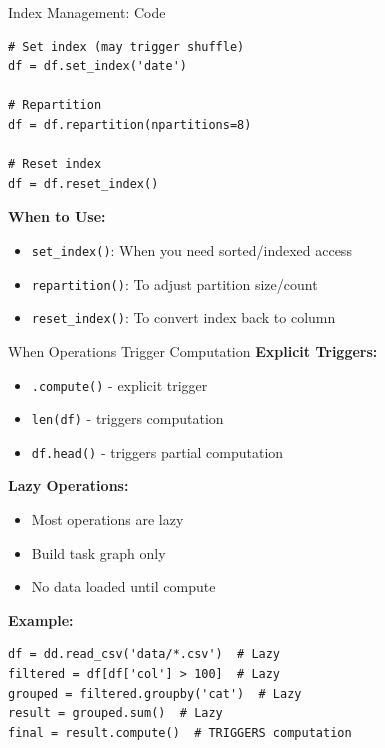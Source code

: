 \documentclass[aspectratio=169]{beamer}
\begin{document}
\begin{frame}[fragile]{Index Management: Code}
\small
\begin{lstlisting}[basicstyle=\ttfamily\tiny]
# Set index (may trigger shuffle)
df = df.set_index('date')

# Repartition
df = df.repartition(npartitions=8)

# Reset index
df = df.reset_index()
\end{lstlisting}

\vspace{0.2cm}
\textbf{When to Use:}
\begin{itemize}
    \item \texttt{set\_index()}: When you need sorted/indexed access
    \item \texttt{repartition()}: To adjust partition size/count
    \item \texttt{reset\_index()}: To convert index back to column
\end{itemize}
\end{frame}

\begin{frame}[fragile]{When Operations Trigger Computation}
\small
\textbf{Explicit Triggers:}
\begin{itemize}
    \item \texttt{.compute()} - explicit trigger
    \item \texttt{len(df)} - triggers computation
    \item \texttt{df.head()} - triggers partial computation
\end{itemize}

\textbf{Lazy Operations:}
\begin{itemize}
    \item Most operations are lazy
    \item Build task graph only
    \item No data loaded until compute
\end{itemize}

\vspace{0.15cm}
\textbf{Example:}
\begin{lstlisting}
df = dd.read_csv('data/*.csv')  # Lazy
filtered = df[df['col'] > 100]  # Lazy
grouped = filtered.groupby('cat')  # Lazy
result = grouped.sum()  # Lazy
final = result.compute()  # TRIGGERS computation
\end{lstlisting}
\end{frame}
\end{document}
